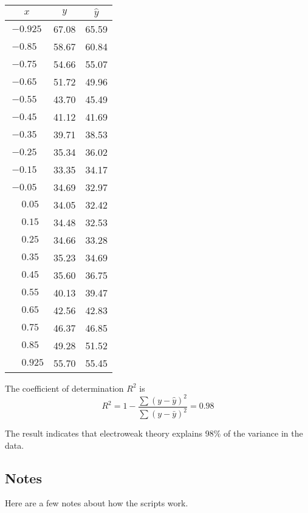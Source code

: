 \documentclass[12pt]{article}
\begin{document}
\begin{center}
\begin{tabular}{|c|c|c|}
\hline
$x$ & $y$ & $\hat{y}$ \\
\hline
$-0.925$ & 67.08 & 65.59\\
$-0.85\phantom{0}$ & 58.67 & 60.84\\
$-0.75\phantom{0}$ & 54.66 & 55.07\\
$-0.65\phantom{0}$ & 51.72 & 49.96\\
$-0.55\phantom{0}$ & 43.70 & 45.49\\
$-0.45\phantom{0}$ & 41.12 & 41.69\\
$-0.35\phantom{0}$ & 39.71 & 38.53\\
$-0.25\phantom{0}$ & 35.34 & 36.02\\
$-0.15\phantom{0}$ & 33.35 & 34.17\\
$-0.05\phantom{0}$ & 34.69 & 32.97\\
$\phantom{+}0.05\phantom{0}$ & 34.05 & 32.42\\
$\phantom{+}0.15\phantom{0}$ & 34.48 & 32.53\\
$\phantom{+}0.25\phantom{0}$ & 34.66 & 33.28\\
$\phantom{+}0.35\phantom{0}$ & 35.23 & 34.69\\
$\phantom{+}0.45\phantom{0}$ & 35.60 & 36.75\\
$\phantom{+}0.55\phantom{0}$ & 40.13 & 39.47\\
$\phantom{+}0.65\phantom{0}$ & 42.56 & 42.83\\
$\phantom{+}0.75\phantom{0}$ & 46.37 & 46.85\\
$\phantom{+}0.85\phantom{0}$ & 49.28 & 51.52\\
$\phantom{+}0.925$ & 55.70 & 55.45\\
\hline
\end{tabular}
\end{center}

\noindent
The coefficient of determination $R^2$ is
\begin{equation*}
R^2=1-\frac{\sum(y-\hat{y})^2}{\sum(y-\bar{y})^2}=0.98
\end{equation*}

\noindent
The result indicates that electroweak theory explains 98\% of the variance in the data.

\subsection*{Notes}
Here are a few notes about how the scripts work.
\end{document}
